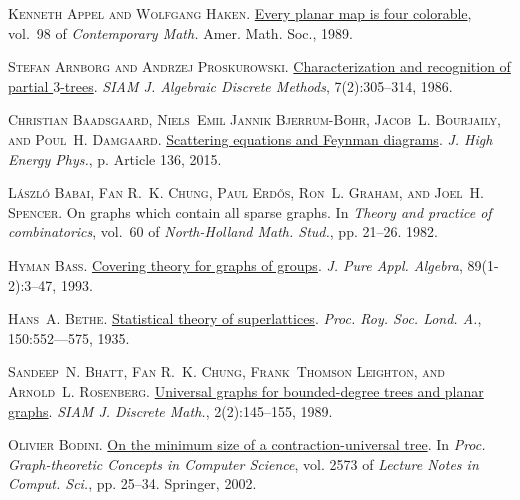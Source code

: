 \documentclass[a4paper,11pt]{article}
\theoremstyle{plain}
\theoremstyle{definition}
\begin{document}
\textsc{Kenneth Appel and Wolfgang Haken}.
\newblock \href{https://doi.org/10.1090/conm/098}{Every planar map is four
  colorable}, vol.~98 of \emph{Contemporary Math.}
\newblock Amer. Math. Soc., 1989.

\textsc{Stefan Arnborg and Andrzej Proskurowski}.
\newblock \href{https://doi.org/10.1137/0607033}{Characterization and
  recognition of partial $3$-trees}.
\newblock \emph{SIAM J. Algebraic Discrete Methods}, 7(2):305--314, 1986.

\textsc{Christian Baadsgaard, Niels~Emil Jannik Bjerrum-Bohr, Jacob~L.
  Bourjaily, and Poul~H. Damgaard}.
\newblock \href{https://doi.org/10.1007/JHEP09(2015)136}{Scattering equations
  and {F}eynman diagrams}.
\newblock \emph{J. High Energy Phys.}, p. Article 136, 2015.

\textsc{L{\'a}szl{\'o} Babai, Fan R.~K. Chung, Paul Erd\H{o}s, Ron~L. Graham,
  and Joel~H. Spencer}.
\newblock On graphs which contain all sparse graphs.
\newblock In \emph{Theory and practice of combinatorics}, vol.~60 of
  \emph{North-Holland Math. Stud.}, pp. 21--26. 1982.

\textsc{Hyman Bass}.
\newblock \href{https://doi.org/10.1016/0022-4049(93)90085-8}{Covering theory
  for graphs of groups}.
\newblock \emph{J. Pure Appl. Algebra}, 89(1-2):3--47, 1993.

\textsc{Hans~A. Bethe}.
\newblock \href{https://doi.org/10.1098/rspa.1935.0122}{Statistical theory of
  superlattices}.
\newblock \emph{Proc. Roy. Soc. Lond. A.}, 150:552--–575, 1935.

\textsc{Sandeep~N. Bhatt, Fan R.~K. Chung, Frank~Thomson Leighton, and
  Arnold~L. Rosenberg}.
\newblock \href{https://doi.org/10.1137/0402014}{Universal graphs for
  bounded-degree trees and planar graphs}.
\newblock \emph{{SIAM} J. Discrete Math.}, 2(2):145--155, 1989.

\textsc{Olivier Bodini}.
\newblock \href{https://doi.org/10.1007/3-540-36379-3_3}{On the minimum size of
  a contraction-universal tree}.
\newblock In \emph{Proc. Graph-theoretic Concepts in Computer Science}, vol.
  2573 of \emph{Lecture Notes in Comput. Sci.}, pp. 25--34. Springer, 2002.
\end{document}
